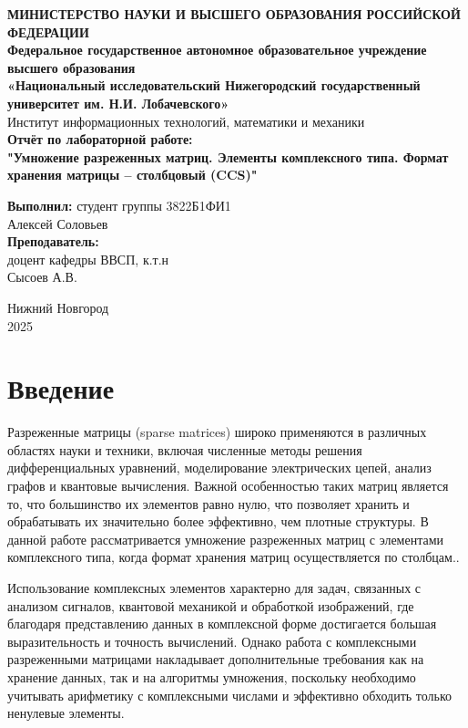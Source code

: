 \documentclass[12pt]{article}
\begin{document}
\begin{titlepage}
\begin{center}
\textbf{МИНИСТЕРСТВО НАУКИ И ВЫСШЕГО ОБРАЗОВАНИЯ РОССИЙСКОЙ ФЕДЕРАЦИИ} \\
\textbf{Федеральное государственное автономное образовательное учреждение высшего образования \\ «Национальный исследовательский Нижегородский государственный университет им. Н.И. Лобачевского»} \\
Институт информационных технологий, математики и механики \\
\vspace{3cm}
{\Large
\textbf{Отчёт по лабораторной работе:} \\[0.5cm]
\textbf{"Умножение разреженных матриц. Элементы комплексного типа. Формат хранения матрицы – столбцовый (CCS)"} \\
}
\vspace{2cm}
\begin{flushright}
\textbf{Выполнил:} студент группы 3822Б1ФИ1\\
Алексей Соловьев \\
\vspace{0.5cm}
\textbf{Преподаватель:} \\
доцент кафедры ВВСП, к.т.н \\ Сысоев А.В.
\end{flushright}
\vspace{2.5cm}
Нижний Новгород \\
2025
\end{center}
\end{titlepage}

\newpage
\section{Введение}

Разреженные матрицы (sparse matrices) широко применяются в различных областях науки и техники, включая численные методы решения дифференциальных уравнений, моделирование электрических цепей, анализ графов и квантовые вычисления. Важной особенностью таких матриц является то, что большинство их элементов равно нулю, что позволяет хранить и обрабатывать их значительно более эффективно, чем плотные структуры. В данной работе рассматривается умножение разреженных матриц с элементами комплексного типа, когда формат хранения матриц осуществляется по столбцам..

Использование комплексных элементов характерно для задач, связанных с анализом сигналов, квантовой механикой и обработкой изображений, где благодаря представлению данных в комплексной форме достигается большая выразительность и точность вычислений. Однако работа с комплексными разреженными матрицами накладывает дополнительные требования как на хранение данных, так и на алгоритмы умножения, поскольку необходимо учитывать арифметику с комплексными числами и эффективно обходить только ненулевые элементы.
\end{document}
